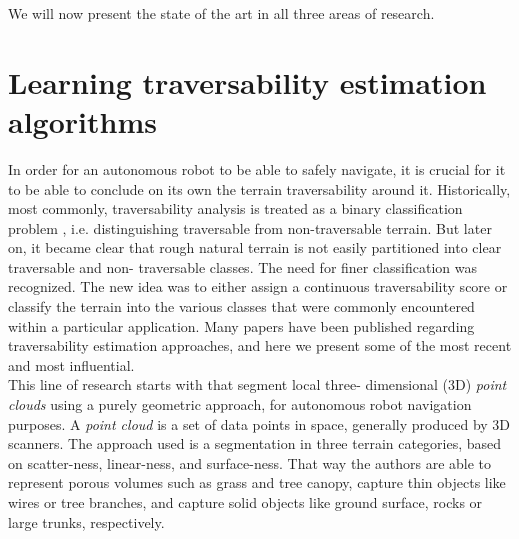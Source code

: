 \documentclass[12pt,a4paper,table,dvipsnames,tikz]{report}
\newcommand{\term}{\textit}
\newcommand{\acronym}{\MakeUppercase}
\begin{document}
	We will now present the state of the art in all three areas of research.
	\\
	
	\section{Learning traversability estimation algorithms}
	\label{sec:bg:trav}
	
	In order for an autonomous robot to be able to safely navigate, it is crucial 
	for it to be able to conclude on its own the terrain traversability 
	around it. Historically, most commonly, traversability analysis is 
	treated as a binary classification problem \citep{Papadakis}, i.e. distinguishing 
	traversable from non-traversable terrain. But later on, it became clear that 
	rough natural terrain is not easily partitioned into clear traversable and non-
	traversable classes. The need for finer classification was recognized. The new 
	idea was to either assign a continuous traversability score or classify 
	the terrain into the various classes that were commonly encountered within a 
	particular application. Many papers have been published regarding 
	traversability estimation approaches, and here we present some of the 
	most recent and most influential.
	\\
	
	This line of research starts with \citet{Lalonde} that segment local three-
	dimensional (\acronym{3d}) \term{point clouds} using a purely geometric 
	approach, for autonomous robot navigation purposes. A 
	\term{point cloud} is a set of data points in space, generally produced by 
	\acronym{3d} scanners. The approach used is a segmentation in three terrain 
	categories, based on scatter-ness, linear-ness, and surface-ness. That way 
	the authors are able to represent porous volumes such as grass and tree canopy, 
	capture thin objects like wires or tree branches, and capture solid objects 
	like ground surface, rocks or large trunks, respectively.
	\\	
	
\end{document}
